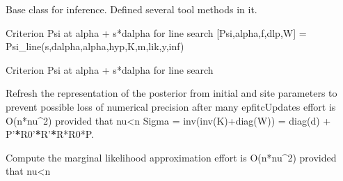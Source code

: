 \documentclass[letterpaper,10pt,english]{sphinxmanual}
\begin{document}
\begin{fulllineitems}
\label{Likelihoods:pyGPs.Core.inf.Inference}
Base class for inference. Defined several tool methods in it.

\begin{fulllineitems}
\label{Likelihoods:pyGPs.Core.inf.Inference.Psi_line}
Criterion Psi at alpha + s*dalpha for line search
{[}Psi,alpha,f,dlp,W{]} = Psi\_line(s,dalpha,alpha,hyp,K,m,lik,y,inf)

\end{fulllineitems}


\begin{fulllineitems}
\label{Likelihoods:pyGPs.Core.inf.Inference.Psi_lineFITC}
Criterion Psi at alpha + s*dalpha for line search

\end{fulllineitems}


\begin{fulllineitems}
\label{Likelihoods:pyGPs.Core.inf.Inference.epfitcRefresh}
Refresh the representation of the posterior from initial and site parameters
to prevent possible loss of numerical precision after many epfitcUpdates
effort is O(n*nu\textasciicircum{}2) provided that nu\textless{}n
Sigma = inv(inv(K)+diag(W)) = diag(d) + P'{\color{red}\bfseries{}*}R0'{\color{red}\bfseries{}*}R'{\color{red}\bfseries{}*}R*R0*P.

\end{fulllineitems}


\begin{fulllineitems}
\label{Likelihoods:pyGPs.Core.inf.Inference.epfitcZ}
Compute the marginal likelihood approximation
effort is O(n*nu\textasciicircum{}2) provided that nu\textless{}n


\end{fulllineitems}
\end{fulllineitems}
\end{document}
